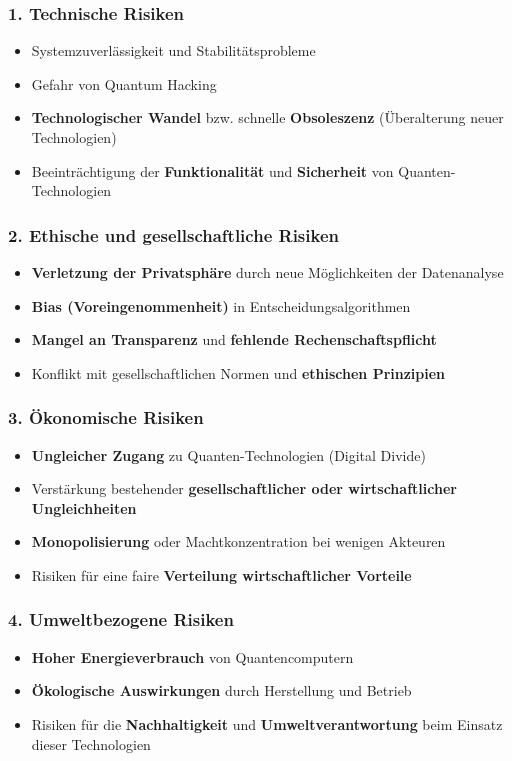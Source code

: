 \subsubsection{\textbf{1. Technische Risiken}}
\begin{itemize}
    \item Systemzuverlässigkeit und Stabilitätsprobleme
    \item Gefahr von Quantum Hacking
    \item \textbf{Technologischer Wandel} bzw. schnelle \textbf{Obsoleszenz} (Überalterung neuer Technologien)
    \item Beeinträchtigung der \textbf{Funktionalität} und \textbf{Sicherheit} von Quanten-Technologien
\end{itemize}

\subsubsection{\textbf{2. Ethische und gesellschaftliche Risiken}}
\begin{itemize}
    \item \textbf{Verletzung der Privatsphäre} durch neue Möglichkeiten der Datenanalyse
    \item \textbf{Bias (Voreingenommenheit)} in Entscheidungsalgorithmen
    \item \textbf{Mangel an Transparenz} und \textbf{fehlende Rechenschaftspflicht}
    \item Konflikt mit gesellschaftlichen Normen und \textbf{ethischen Prinzipien}
\end{itemize}

\subsubsection{\textbf{3. Ökonomische Risiken}}
\begin{itemize}
    \item \textbf{Ungleicher Zugang} zu Quanten-Technologien (Digital Divide)
    \item Verstärkung bestehender \textbf{gesellschaftlicher oder wirtschaftlicher Ungleichheiten}
    \item \textbf{Monopolisierung} oder Machtkonzentration bei wenigen Akteuren
    \item Risiken für eine faire \textbf{Verteilung wirtschaftlicher Vorteile}
\end{itemize}

\subsubsection{\textbf{4. Umweltbezogene Risiken}}
\begin{itemize}
    \item \textbf{Hoher Energieverbrauch} von Quantencomputern
    \item \textbf{Ökologische Auswirkungen} durch Herstellung und Betrieb
    \item Risiken für die \textbf{Nachhaltigkeit} und \textbf{Umweltverantwortung} beim Einsatz dieser Technologien
\end{itemize}

